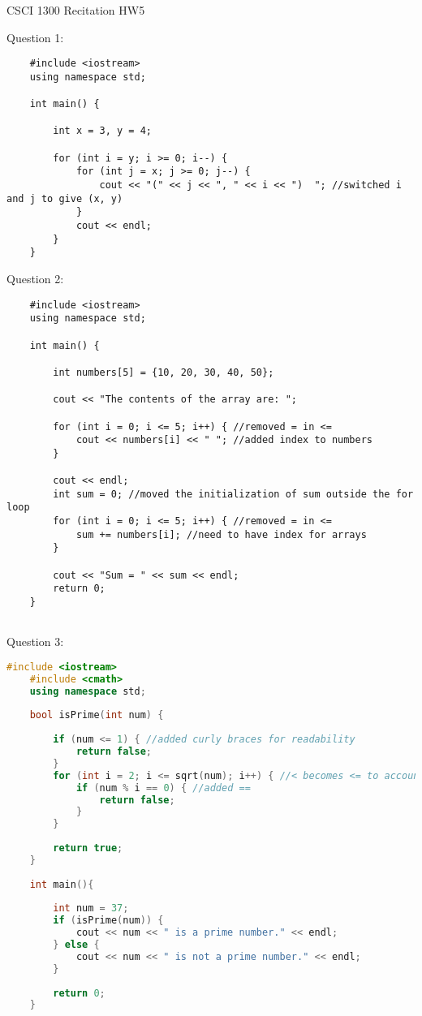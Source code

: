 \documentclass{article}
\begin{document}
CSCI 1300 Recitation HW5

\vspace{1cm}

Question 1:

\begin{verbatim}
    #include <iostream>
    using namespace std;

    int main() {

        int x = 3, y = 4;

        for (int i = y; i >= 0; i--) {
            for (int j = x; j >= 0; j--) {
                cout << "(" << j << ", " << i << ")  "; //switched i and j to give (x, y)
            }
            cout << endl;
        }
    }
\end{verbatim}

\vspace{1cm}

Question 2:

\begin{verbatim}
    #include <iostream>
    using namespace std;
    
    int main() {
    
        int numbers[5] = {10, 20, 30, 40, 50};
    
        cout << "The contents of the array are: ";
    
        for (int i = 0; i <= 5; i++) { //removed = in <=
            cout << numbers[i] << " "; //added index to numbers
        }
    
        cout << endl;
        int sum = 0; //moved the initialization of sum outside the for loop
        for (int i = 0; i <= 5; i++) { //removed = in <=
            sum += numbers[i]; //need to have index for arrays
        }
    
        cout << "Sum = " << sum << endl;
        return 0;
    }
    
\end{verbatim}

\vspace{1cm}

Question 3:


\begin{lstlisting}[language=C++]
    #include <iostream>
    #include <cmath>
    using namespace std;
    
    bool isPrime(int num) {
    
        if (num <= 1) { //added curly braces for readability
            return false;
        }
        for (int i = 2; i <= sqrt(num); i++) { //< becomes <= to account for perfect squares
            if (num % i == 0) { //added ==
                return false;
            }
        }
    
        return true;
    }
    
    int main(){
    
        int num = 37;
        if (isPrime(num)) {
            cout << num << " is a prime number." << endl;
        } else {
            cout << num << " is not a prime number." << endl;
        }
    
        return 0;
    }
\end{lstlisting}
\end{document}
